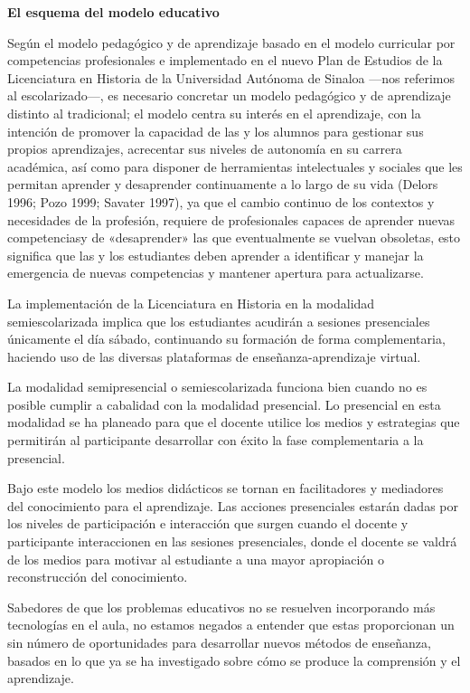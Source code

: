 \bigskip
{\bfseries El esquema del modelo educativo}

Según el modelo pedagógico y de aprendizaje basado en el modelo 
curricular por competencias profesionales e implementado en el nuevo 
Plan de Estudios de la Licenciatura en Historia de la Universidad 
Autónoma de Sinaloa ---nos referimos al escolarizado---, es necesario 
concretar un  modelo pedagógico y de aprendizaje distinto al 
tradicional; el modelo centra su interés en el aprendizaje, con la 
intención de promover la capacidad de las y los alumnos para gestionar 
sus propios aprendizajes, acrecentar sus niveles de autonomía en su 
carrera académica, así como para disponer de herramientas intelectuales 
y sociales que les permitan aprender y desaprender continuamente a lo 
largo de su vida (Delors 1996; Pozo 1999; Savater 1997), ya que el 
cambio continuo de los contextos y necesidades de la profesión, 
requiere de profesionales capaces de aprender nuevas competencias\linebreak y de 
«desaprender» las que eventualmente se vuelvan obsoletas, esto 
significa que las y los estudiantes deben aprender a identificar y 
manejar la emergencia de nuevas competencias y mantener apertura para 
actualizarse.  

La implementación de la Licenciatura en Historia en la modalidad 
semiescolarizada implica que los estudiantes acudirán a sesiones 
presenciales únicamente el día sábado, continuando su formación de 
forma complementaria, haciendo uso de las diversas plataformas de 
en\-se\-ñan\-za-apren\-di\-za\-je virtual. 

La modalidad semipresencial o semiescolarizada funciona bien cuando no 
es posible cumplir a cabalidad con la modalidad presencial. Lo 
presencial en esta modalidad se ha planeado para que el docente utilice 
los medios y estrategias que permitirán al participante desarrollar con 
éxito la fase complementaria a la presencial.  

Bajo este modelo los medios didácticos se tornan en facilitadores y 
mediadores del conocimiento para el aprendizaje. Las acciones 
presenciales estarán dadas por los niveles de participación e 
interacción que surgen cuando el docente y participante interaccionen 
en las sesiones presenciales, donde el docente se valdrá de los medios 
para motivar al estudiante a una mayor apropiación o reconstrucción del 
conocimiento.

Sabedores de que los problemas educativos no se resuelven incorporando 
más tecnologías en el aula, no estamos negados a entender que estas 
proporcionan un sin número de oportunidades para desarrollar nuevos 
métodos de enseñanza, basados en lo que ya se ha investigado sobre cómo 
se produce la comprensión y el aprendizaje.
\newpage

